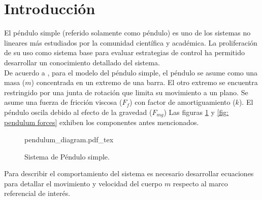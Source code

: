 \section{Introducción}


El péndulo simple (referido solamente como péndulo) es uno 
de los sistemas no lineares más estudiados por la 
comunidad científica y académica. La proliferación de su
uso como sistema base para evaluar estrategias de control ha
permitido desarrollar un conocimiento detallado del sistema.\\

De acuerdo a \cite{sastry}, para el modelo del péndulo simple, 
el péndulo se asume como una masa ($m$) concentrada en un extremo
de una barra. El otro extremo se encuentra restringido por una
junta de rotación que limita su movimiento a un plano. 
Se asume una fuerza de fricción viscosa ($F_f$) con factor de amortiguamiento
 ($k$). El péndulo oscila debido al efecto de la gravedad ($F_{mg}$)
Las figuras \ref{fig: simple pendulum} y \ref{fig: pendulum forces} exhiben 
los componentes antes mencionados.

 \begin{figure}[ht]
    \centering
    {pendulum_diagram.pdf_tex}
    \caption{Sistema de Péndulo simple.}
    \label{fig: simple pendulum}
\end{figure}


Para describir el comportamiento del sistema es necesario desarrollar
ecuaciones para detallar el movimiento y velocidad del cuerpo $m$ 
respecto al marco referencial de interés.

